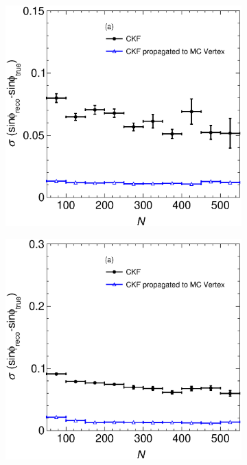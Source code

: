 \begin{figure}[t]
\begin{subfigure}{0.32\textwidth}
        \includegraphics[width=\textwidth]{figures/ch6-TKI/sinphiRes/RessinphiVSNPoints_VertexComparison_211.eps}
         \caption{} \label{fig:RessinphiVSNPoints_VertexComparison_211}
     \end{subfigure}
    \begin{subfigure}{0.32\textwidth}
         \centering
        \includegraphics[width=\textwidth]{figures/ch6-TKI/sinphiRes/RessinphiVSNPoints_VertexComparison_2212.eps}

\end{subfigure}
\end{figure}
